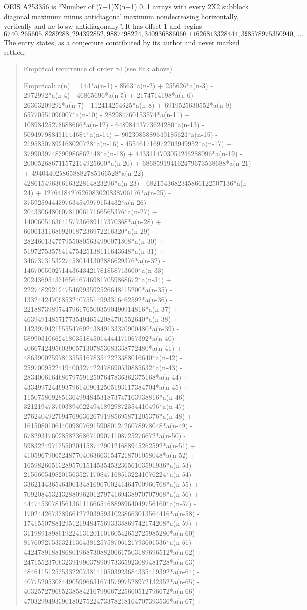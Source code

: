 \documentclass[11pt,a4paper]{article}
\theoremstyle{plain}
\theoremstyle{definition}
\begin{document}
OEIS A253356 is ``Number of (7+1)X(n+1) 0..1 arrays with every 2X2 subblock diagonal maximum minus antidiagonal maximum nondecreasing horizontally, vertically and ne-to-sw antidiagonally.''. It has offset $1$ and begins
\[
6740, 265605, 8289288, 294392852, 9887498224, 340936886060, 11626813328444, 398578975350940,\ \dots
\]
The entry states, as a conjecture contributed by its author and never marked settled:
\begin{quote}
Empirical recurrence of order 84 (see link above)

Empirical: a(n) = 144*a(n-1) - 8563*a(n-2) + 255626*a(n-3) - 2972992*a(n-4) - 46865696*a(n-5) + 2174714198*a(n-6) - 26363209292*a(n-7) - 112414254625*a(n-8) + 6919525630552*a(n-9) - 65770551096007*a(n-10) - 282984760153574*a(n-11) + 10898425278688666*a(n-12) - 64898443773624280*a(n-13) - 509497988431144684*a(n-14) + 9023085889649185624*a(n-15) - 21958507892168020728*a(n-16) - 455461716972203949952*a(n-17) + 3799039748390986862448*a(n-18) + 4433114703051246288096*a(n-19) - 200052686711572114925600*a(n-20) + 686859194162479673538688*a(n-21) + 4940440258658882785166528*a(n-22) - 42861549636616322814823296*a(n-23) - 6821543682345866122507136*a(n-24) + 1276418427626083020838706176*a(n-25) - 3759259444397634549979154432*a(n-26) - 20433064806078100617166565376*a(n-27) + 140060516364157736689117370368*a(n-28) + 66061311680920187236972216320*a(n-29) - 2824601347579550805634990071808*a(n-30) + 5197275357941475425138111643648*a(n-31) + 34673731532274580141302886629376*a(n-32) - 146700500271443643421781858713600*a(n-33) - 202436954331656467469817059868672*a(n-34) + 2227482921247546993592526648115200*a(n-35) - 1332442470985324075514993316462592*a(n-36) - 22188739897447961765003590490914816*a(n-37) + 46394914857177354946542084701552640*a(n-38) + 142397942155554769243849133370900480*a(n-39) - 589903106624180351845014444171067392*a(n-40) - 406674249560390571307853683338772480*a(n-41) + 4863900259781355516783542223388016640*a(n-42) - 2597009522419400327422478690530885632*a(n-43) - 28340061646867975912507647836362375168*a(n-44) + 43349972449937961409012505193117384704*a(n-45) + 115075809285136499484531873747163938816*a(n-46) - 321219473700389402249418929872354410496*a(n-47) - 276240492709476963626791985695871205376*a(n-48) + 1615080106140098076915908012426078978048*a(n-49) - 67829317602858236867109071108725276672*a(n-50) - 5983224971355020415874290121688945262592*a(n-51) + 4105967906524877040636631547218701058048*a(n-52) + 16598266513289570151453545323656103591936*a(n-53) - 21566054982015635271708471685132241076224*a(n-54) - 33621443654640013481696700241464700960768*a(n-55) + 70920845321328809620127974169438970707968*a(n-56) + 44474530781561361116665468898964049756160*a(n-57) - 170244267338966127203959310238663013564416*a(n-58) - 17415507881295121948475693338869742174208*a(n-59) + 311989189801922413120110160542652725985280*a(n-60) - 81760927533321136438125758706121793601536*a(n-61) - 442478918818680196873088206617503189696512*a(n-62) + 247155237063239199037890973365923089481728*a(n-63) + 484611512535332207381410503923684335419392*a(n-64) - 407752053084490599663167457997528972132352*a(n-65) - 403257279695238584216799667225660512796672*a(n-66) + 470329949339018027522473378218164707393536*a(n-67) + 
\end{quote}
\end{document}
